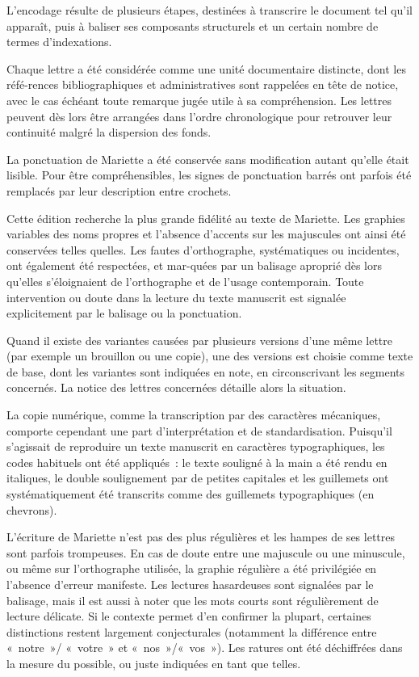 \documentclass{book}
\begin{document}
\par L’encodage résulte de plusieurs étapes, destinées à transcrire le document tel qu’il apparaît, puis à baliser ses composants structurels et un certain nombre de termes d’indexations.
\par Chaque lettre a été considérée comme une unité documentaire distincte, dont les réfé-rences bibliographiques et administratives sont rappelées en tête de notice, avec le cas échéant toute remarque jugée utile à sa compréhension. Les lettres peuvent dès lors être arrangées dans l’ordre chronologique pour retrouver leur continuité malgré la dispersion des fonds.
\par La ponctuation de Mariette a été conservée sans modification autant qu’elle était lisible. Pour être compréhensibles, les signes de ponctuation barrés ont parfois été remplacés par leur description entre crochets.
\par Cette édition recherche la plus grande fidélité au texte de Mariette. Les graphies variables des noms propres et l’absence d’accents sur les majuscules ont ainsi été conservées telles quelles. Les fautes d’orthographe, systématiques ou incidentes, ont également été respectées, et mar-quées par un balisage aproprié dès lors qu’elles s’éloignaient de l’orthographe et de l’usage contemporain. Toute intervention ou doute dans la lecture du texte manuscrit est signalée explicitement par le balisage ou la ponctuation.
\par Quand il existe des variantes causées par plusieurs versions d’une même lettre (par exemple un brouillon ou une copie), une des versions est choisie comme texte de base, dont les variantes sont indiquées en note, en circonscrivant les segments concernés. La notice des lettres concernées détaille alors la situation.
\par La copie numérique, comme la transcription par des caractères mécaniques, comporte cependant une part d’interprétation et de standardisation. Puisqu’il s’agissait de reproduire un texte manuscrit en caractères typographiques, les codes habituels ont été appliqués~: le texte souligné à la main a été rendu en italiques, le double soulignement par de petites capitales et les guillemets ont systématiquement été transcrits comme des guillemets typographiques (en chevrons).
\par L’écriture de Mariette n’est pas des plus régulières et les hampes de ses lettres sont parfois trompeuses. En cas de doute entre une majuscule ou une minuscule, ou même sur l’orthographe utilisée, la graphie régulière a été privilégiée en l’absence d’erreur manifeste. Les lectures hasardeuses sont signalées par le balisage, mais il est aussi à noter que les mots courts sont régulièrement de lecture délicate. Si le contexte permet d’en confirmer la plupart, certaines distinctions restent largement conjecturales (notamment la différence entre «~notre~»/ «~votre~» et «~nos~»/«~vos~»). Les ratures ont été déchiffrées dans la mesure du possible, ou juste indiquées en tant que telles.
\end{document}
